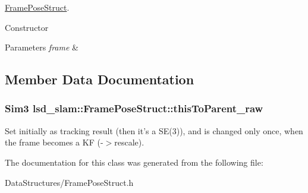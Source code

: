 \hyperlink{classlsd__slam_1_1_frame_pose_struct}{Frame\-Pose\-Struct}. 

Constructor


\begin{DoxyParams}{Parameters}
{\em frame} & \\
\hline
\end{DoxyParams}


\subsection{Member Data Documentation}
\hypertarget{classlsd__slam_1_1_frame_pose_struct_acf840ddb08df60aa537c52b305430a2a}{
\subsubsection[{this\-To\-Parent\-\_\-raw}]{\setlength{\rightskip}{0pt plus 5cm}Sim3 lsd\-\_\-slam\-::\-Frame\-Pose\-Struct\-::this\-To\-Parent\-\_\-raw}}\label{classlsd__slam_1_1_frame_pose_struct_acf840ddb08df60aa537c52b305430a2a}
Set initially as tracking result (then it's a S\-E(3)), and is changed only once, when the frame becomes a K\-F (-\/$>$rescale). 

The documentation for this class was generated from the following file\-:\begin{DoxyCompactItemize}
\item 
Data\-Structures/Frame\-Pose\-Struct.\-h\end{DoxyCompactItemize}
